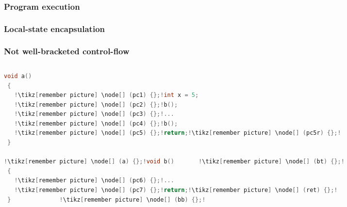 \documentclass[14pt]{beamer}
\begin{document}
\begin{frame}[fragile]
  \frametitle<1-12>{Program execution}
  \frametitle<13>{Local-state encapsulation}
  \frametitle<14->{Not well-bracketed control-flow}
  \begin{columns}
    \begin{column}{0.5\textwidth}
\begin{lstlisting}[language=C, escapechar=!,basicstyle=\footnotesize\ttfamily]
 void a()
 {
   !\tikz[remember picture] \node[] (pc1) {};!int x = 5;
   !\tikz[remember picture] \node[] (pc2) {};!b();
   !\tikz[remember picture] \node[] (pc3) {};!...
   !\tikz[remember picture] \node[] (pc4) {};!b();
   !\tikz[remember picture] \node[] (pc5) {};!return;!\tikz[remember picture] \node[] (pc5r) {};!
 }

!\tikz[remember picture] \node[] (a) {};!void b()       !\tikz[remember picture] \node[] (bt) {};! 
 {
   !\tikz[remember picture] \node[] (pc6) {};!...
   !\tikz[remember picture] \node[] (pc7) {};!return;!\tikz[remember picture] \node[] (ret) {};!      
 }              !\tikz[remember picture] \node[] (bb) {};!

\end{lstlisting}
\newcommand{\myarrow}[2]{\draw<#1> ($#2 + (-0.5,0)$) edge[-stealth,thick,draw={rgb:red,180;green,52;blue,202}] node {} #2;}
\newcommand{\myarrowred}[2]{\draw<#1> ($#2 + (-0.5,0)$) edge[-stealth,thick,draw=red] node {} #2;}
\end{column}
\end{columns}
\end{frame}
\end{document}
